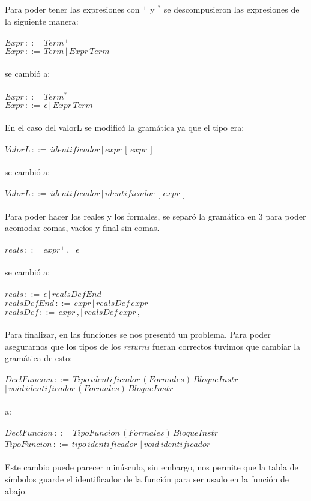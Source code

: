 \documentclass[11pt]{article}
\begin{document}
Para poder tener las expresiones con $^+$ y $^*$ se descompusieron las expresiones de la siguiente manera:
\\\\
$Expr\,::=\,Term^+$
\\
$Expr\,::=\,Term\,|\,Expr\,Term$
\\\\
se cambió a:
\\\\
$Expr\,::=\,Term^*$
\\
$Expr\,::=\,\epsilon\,|\,Expr\,Term$
\\\\
En el caso del valorL se modificó la gramática ya que el tipo era:
\\\\
$ValorL\,::=\,identificador\,|\,expr\,[\,expr\,]$
\\\\
se cambió a:
\\\\
$ValorL\,::=\,identificador\,|\,identificador\,[\,expr\,]$
\\\\
Para poder hacer los reales y los formales, se separó la gramática en 3 para poder acomodar comas, vacíos y final sin comas.
\\\\
$reals\,::=\,expr^+\,,\,|\,\epsilon$
\\\\
se cambió a:
\\\\
$reals\,::=\,\epsilon\,|\,realsDefEnd$
\\
$realsDefEnd\,::=\,expr\,|\,realsDef\,expr$
\\
$realsDef\,::=\,expr\,,|\,realsDef\,expr\,,$
\\\\
Para finalizar, en las funciones se nos presentó un problema. Para poder asegurarnos que los tipos de los \textit{returns} fueran correctos tuvimos que cambiar la gramática de esto:
\\\\
$DeclFuncion\,::=\,Tipo\,identificador\,(Formales)\,BloqueInstr$
\\
$|\,void \,identificador\,(Formales)\,BloqueInstr$
\\\\
a:
\\\\
$DeclFuncion\,::=\,TipoFuncion\,(Formales)\,BloqueInstr$
\\
$TipoFuncion\,::=\,tipo\,identificador$
$|\,void\,identificador$
\\\\
Este cambio puede parecer minúsculo, sin embargo, nos permite que la tabla de símbolos guarde el identificador de la función para ser usado en la función de abajo.
\end{document}

